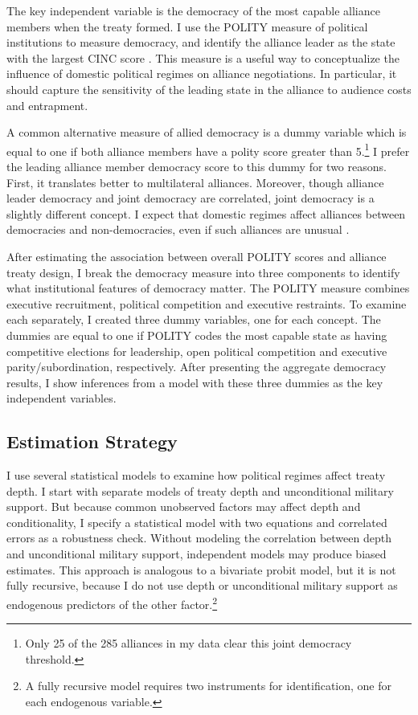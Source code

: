 \documentclass[12pt]{article}
\begin{document}
The key independent variable is the democracy of the most capable alliance members when the treaty formed. 
I use the POLITY measure of political institutions to measure democracy, and identify the alliance leader as the state with the largest CINC score \citep{SingerCINC1988}.
This measure is a useful way to conceptualize the influence of domestic political regimes on alliance negotiations. 
In particular, it should capture the sensitivity of the leading state in the alliance to audience costs and entrapment. 


A common alternative measure of allied democracy is a dummy variable which is equal to one if both alliance members have a polity score greater than 5.\footnote{Only 25 of the 285 alliances in my data clear this joint democracy threshold.}
I prefer the leading alliance member democracy score to this dummy for two reasons.
First, it translates better to multilateral alliances. 
Moreover, though alliance leader democracy and joint democracy are correlated, joint democracy is a slightly different concept. 
I expect that domestic regimes affect alliances between democracies and non-democracies, even if such alliances are unusual \citep{Leeds1999}.


After estimating the association between overall POLITY scores and alliance treaty design, I break the democracy measure into three components to identify what institutional features of democracy matter.  
The POLITY measure combines executive recruitment, political competition and executive restraints. 
To examine each separately, I created three dummy variables, one for each concept. 
The dummies are equal to one if POLITY codes the most capable state as having competitive elections for leadership, open political competition and executive parity/subordination, respectively. 
After presenting the aggregate democracy results, I show inferences from a model with these three dummies as the key independent variables.


\subsection{Estimation Strategy}

I use several statistical models to examine how political regimes affect treaty depth. 
I start with separate models of treaty depth and unconditional military support. 
But because common unobserved factors may affect depth and conditionality, I specify a statistical model with two equations and correlated errors as a robustness check. 
Without modeling the correlation between depth and unconditional military support, independent models may produce biased estimates. 
This approach is analogous to a bivariate probit model, but it is not fully recursive, because I do not use depth or unconditional military support as endogenous predictors of the other factor.\footnote{A fully recursive model requires two instruments for identification, one for each endogenous variable.}  
\end{document}
